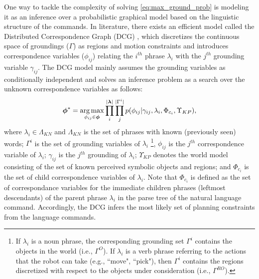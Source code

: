 One way to tackle the complexity of solving \eqref{eq:max_ground_prob} is modeling it as an inference over a probabilistic graphical model based on the linguistic structure of the commands. In literature, there exists an efficient model called the Distributed Correspondence Graph (DCG) \cite{dcg}, which discretizes the continuous space of groundings ($\Gamma$) as regions and motion constraints and introduces correspondence variables ($\phi_{ij}$) relating the $i^{th}$ phrase $\lambda_i$ with the $j^{th}$ grounding variable $\gamma_{ij}$. The DCG model mainly assumes the grounding variables as conditionally independent and solves an inference problem as a search over the unknown correspondence variables as follows: 
\begin{equation}
\label{eq:dcg_factored1}
\begin{split}
\boldsymbol{\phi}^* = \operatorname*{\arg\max}_{\phi_{ij} \in \boldsymbol{\phi}} \prod_{i}^{| \boldsymbol{\lambda}|} \prod_{j}^{|\Gamma^i|} p(\phi_{ij}|\gamma_{ij},\lambda_i, \Phi_{c_{i}}, \Upsilon_{KP}),
\end{split}
\end{equation}
where $\lambda_i \in \Lambda_{KN}$ and $\Lambda_{KN}$ is the set of phrases with known (previously seen) words; $\Gamma^i$ is the set of grounding variables of $\lambda_i$ \footnote{If $\lambda_i$ is a noun phrase, the corresponding grounding set $\Gamma^i$ contains the objects in the world (i.e., $\Gamma^O$). If $\lambda_i$ is a verb phrase referring to the actions that the robot can take (e.g., ``move", ``pick"), then $\Gamma^i$ contains the regions discretized with respect to the objects under consideration (i.e., $\Gamma^{RO}$).}, $\phi_{ij}$ is the $j^{th}$ correspondence variable of $\lambda_i$; $\gamma_{ij}$ is the $j^{th}$ grounding of $\lambda_i$; $\Upsilon_{KP}$ denotes the world model consisting of the set of known perceived symbolic objects and regions; and  $\Phi_{c_{i}}$ is the set of child correspondence variables of $\lambda_{i}$. Note that $\Phi_{c_{i}}$ is defined as the set of correspondance variables for the immediate children phrases (leftmost descendants) of the parent phrase $\lambda_i$ in the parse tree of the natural language command. Accordingly, the DCG infers the most likely set of planning constraints from the language commands.


